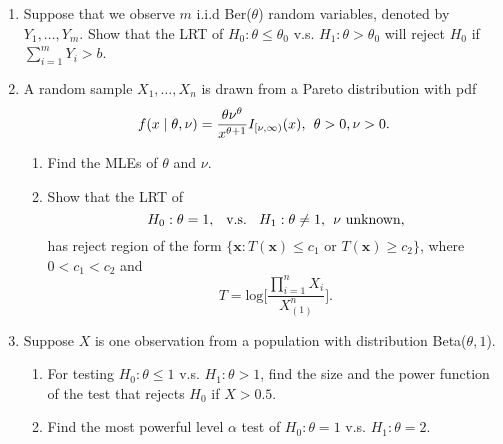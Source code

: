 \documentclass[12pt]{extarticle}
\newcommand{\x}{\mathbf x}
\begin{document}
\begin{enumerate}
	\item Suppose that we observe $m$ i.i.d Ber($\theta$) random variables, denoted by $Y_1,\ldots, Y_m$. Show that the LRT of $H_0:\theta\leq\theta_0$ v.s. $H_1:\theta>\theta_0$ will reject $H_0$ if $\sum_{i=1}^mY_i > b$.
    \vspace{3.5cm}
    \item A random sample $X_1, \ldots, X_n$ is drawn from a Pareto distribution with pdf
        $$f(x\mid \theta,\nu) = \dfrac{\theta\nu^\theta}{x^{\theta+1}}I_{[\nu, \infty)}(x), \hspace{1ex} \theta > 0, \vspace{1ex} \nu >0.$$
        \begin{enumerate}
            \item Find the MLEs of $\theta$ and $\nu$.
            \item Show that the LRT of $$H_0:\theta=1, \hspace{1ex}\text{ v.s. }\hspace{1ex}  H_1:\theta\neq 1, \hspace{1ex}\nu \text{ unknown},$$ has reject region of the form $\{\x:T(\x)\leq c_1\text{ or }T(\x)\geq c_2\}$, where $0<c_1<c_2$ and $$T = \text{log}\Big[\dfrac{\prod_{i=1}^nX_i}{X_{(1)}^n}\Big].$$
        \end{enumerate}
    \vspace{4cm}
	\item Suppose $X$ is one observation from a population with distribution Beta($\theta,1$).
	\begin{enumerate}
        \item For testing $H_0:\theta\leq 1$ v.s. $H_1:\theta>1$, find the size and the power function of the test that rejects $H_0$ if $X>0.5$.
        \item Find the most powerful level $\alpha$ test of $H_0:\theta= 1$ v.s. $H_1:\theta=2$.
    \end{enumerate} 
\end{enumerate}
\end{document}
